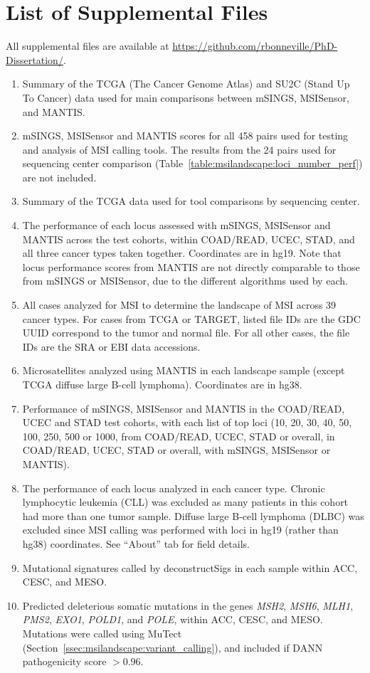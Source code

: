 \section{List of Supplemental Files}
All supplemental files are available at \url{https://github.com/rbonneville/PhD-Dissertation/}.
\begin{enumerate}
    \renewcommand*{\labelenumi}{S\thechapter{}.\arabic{enumi}. }
    \item Summary of the TCGA (The Cancer Genome Atlas) and SU2C (Stand Up To Cancer) data used for main comparisons between mSINGS, MSISensor, and MANTIS\@.
    \item mSINGS, MSISensor and MANTIS scores for all 458 pairs used for testing and analysis of MSI calling tools. The results from the 24 pairs used for sequencing center comparison (Table~\ref{table:msilandscape:loci_number_perf}) are not included.
    \item Summary of the TCGA data used for tool comparisons by sequencing center.
    \item The performance of each locus assessed with mSINGS, MSISensor and MANTIS across the test cohorts, within COAD/READ, UCEC, STAD, and all three cancer types taken together. Coordinates are in hg19. Note that locus performance scores from MANTIS are not directly comparable to those from mSINGS or MSISensor, due to the different algorithms used by each.
	\item All cases analyzed for MSI to determine the landscape of MSI across 39 cancer types. For cases from TCGA or TARGET, listed file IDs are the GDC UUID correspond to the tumor and normal file. For all other cases, the file IDs are the SRA or EBI data accessions.
	\item Microsatellites analyzed using MANTIS in each landscape sample (except TCGA diffuse large B-cell lymphoma). Coordinates are in hg38.
    \item Performance of mSINGS, MSISensor and MANTIS in the COAD/READ, UCEC and STAD test cohorts, with each list of top loci (10, 20, 30, 40, 50, 100, 250, 500 or 1000, from COAD/READ, UCEC, STAD or overall, in COAD/READ, UCEC, STAD or overall, with mSINGS, MSISensor or MANTIS).
	\item The performance of each locus analyzed in each cancer type. Chronic lymphocytic leukemia (CLL) was excluded as many patients in this cohort had more than one tumor sample. Diffuse large B-cell lymphoma (DLBC) was excluded since MSI calling was performed with loci in hg19 (rather than hg38) coordinates. See ``About'' tab for field details.
	\item Mutational signatures called by deconstructSigs in each sample within ACC, CESC, and MESO.
	\item Predicted deleterious somatic mutations in the genes \textit{MSH2}, \textit{MSH6}, \textit{MLH1}, \textit{PMS2}, \textit{EXO1}, \textit{POLD1}, and \textit{POLE}, within ACC, CESC, and MESO. Mutations were called using MuTect (Section~\ref{ssec:msilandscape:variant_calling}), and included if DANN pathogenicity score $>0.96$.
\end{enumerate}


